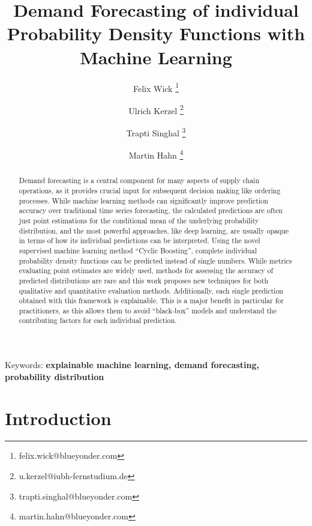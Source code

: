 \documentclass[BCOR=1mm, DIV=calc,10pt,
twoside=true,
twocolumn,
headings=normal]{scrartcl}
\begin{document}
\title{Demand Forecasting of individual Probability Density Functions with Machine Learning}

\author[1]{Felix Wick \thanks{felix.wick@blueyonder.com}}
\author[2]{Ulrich Kerzel \thanks{u.kerzel@iubh-fernstudium.de}}
\author[1]{Trapti Singhal \thanks{trapti.singhal@blueyonder.com}}
\author[1]{Martin Hahn \thanks{martin.hahn@blueyonder.com}}


\date{}

\maketitle

\begin{abstract}
Demand forecasting is a central component for many aspects of supply chain operations, as it provides crucial input for subsequent decision making like ordering processes. While machine learning methods can significantly improve prediction accuracy over traditional time series forecasting, the calculated predictions are often just point estimations for the conditional mean of the underlying probability distribution, and the most powerful approaches, like deep learning, are usually opaque in terms of how its individual predictions can be interpreted. Using the novel supervised machine learning method ``Cyclic Boosting'', complete individual probability density functions can be predicted instead of single numbers. While metrics evaluating point estimates are widely used, methods for assessing the accuracy of predicted distributions are rare and this work proposes new techniques for both qualitative and quantitative evaluation methods. Additionally, each single prediction obtained with this framework is explainable. This is a major benefit in particular for practitioners, as this allows them to avoid ``black-box'' models and understand the contributing factors for each individual prediction. 
\end{abstract}

{Keywords: \textbf{explainable machine learning, demand forecasting, probability distribution}}


\section{Introduction}
\label{sec:intro}
\end{document}
